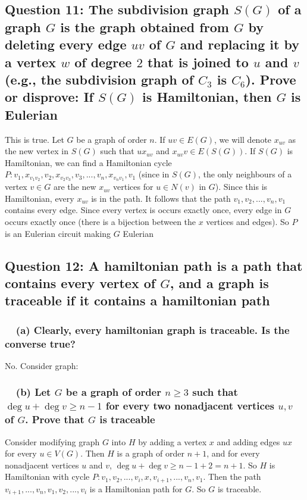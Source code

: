\documentclass[letterpaper, 11pt]{article}
\newcommand{\1}{\mathds{1}}	%
\theoremstyle{definition}
\begin{document}
 \subsection*{Question 11: The subdivision graph $S(G)$ of a graph $G$ is the graph obtained from $G$ by deleting every edge $uv$ of $G$ and replacing it by a vertex $w$ of degree $2$ that is joined to $u$ and $v$ (e.g., the subdivision graph of $C_3$ is $C_6$). Prove or disprove: If $S(G)$ is Hamiltonian, then $G$ is Eulerian}
 This is true. Let $G$ be a graph of order $n$. If $uv \in E(G)$, we will denote $x_{uv}$ as the new vertex in $S(G)$ such that $ux_{uv}$ and $x_{uv}v \in E(S(G))$. If $S(G)$ is Hamiltonian, we can find a Hamiltonian cycle $P:v_1, x_{v_1v_2}, v_2, x_{v_2v_3},v_3,...,v_n,x_{v_nv_1},v_1$ (since in $S(G)$, the only neighbours of a vertex $v \in G$ are the new $x_{uv}$ vertices for $u \in N(v)$ in $G$). Since this is Hamiltonian, every $x_{uv}$ is in the path. It follows that the path $v_1,v_2,...,v_n,v_1$ contains every edge. Since every vertex is occurs exactly once, every edge in $G$ occurs exactly once (there is a bijection between the $x$ vertices and edges). So $P$ is an Eulerian circuit making $G$ Eulerian

\subsection*{Question 12: A hamiltonian path is a path that contains every vertex of $G$, and a graph is traceable if it contains a hamiltonian path}
\subsubsection*{\ \ (a) Clearly, every hamiltonian graph is traceable. Is the converse true?}
No. Consider graph:

\begin{figure}[h]\centering
{}
\end{figure}
\subsubsection*{\ \ (b) Let $G$ be a graph of order $n\ge 3$ such that $\deg u + \deg v \ge n-1$ for every two nonadjacent vertices $u,v$ of $G$. Prove that $G$ is traceable}
Consider modifying graph $G$ into $H$ by adding a vertex $x$ and adding edges $ux$ for every $u \in V(G)$. Then $H$ is a graph of order $n+1$, and for every nonadjacent vertices $u$ and $v$, $\deg u + \deg v \ge n-1+2 = n+1$. So $H$ is Hamiltonian with cycle $P:v_1, v_2, ..., v_i, x, v_{i+1},...,v_n,v_1$. Then the path $v_{i+1}, ..., v_n, v_1, v_2, ..., v_i$ is a Hamiltonian path for $G$. So $G$ is traceable.
\end{document}
